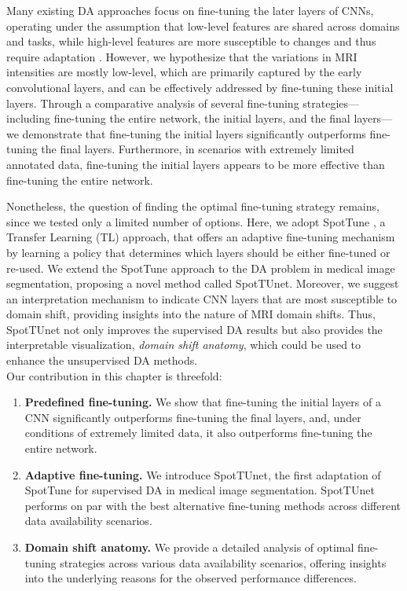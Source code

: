 Many existing DA approaches focus on fine-tuning the later layers of CNNs, operating under the assumption that low-level features are shared across domains and tasks, while high-level features are more susceptible to changes and thus require adaptation \cite{yosinski2014transferable}. However, we hypothesize that the variations in MRI intensities are mostly low-level, which are primarily captured by the early convolutional layers, and can be effectively addressed by fine-tuning these initial layers. Through a comparative analysis of several fine-tuning strategies---including fine-tuning the entire network, the initial layers, and the final layers---we demonstrate that fine-tuning the initial layers significantly outperforms fine-tuning the final layers. Furthermore, in scenarios with extremely limited annotated data, fine-tuning the initial layers appears to be more effective than fine-tuning the entire network.

Nonetheless, the question of finding the optimal fine-tuning strategy remains, since we tested only a limited number of options. Here, we adopt SpotTune \cite{guo2019spottune}, a Transfer Learning (TL) approach, that offers an adaptive fine-tuning mechanism by learning a policy that determines which layers should be either fine-tuned or re-used. We extend the SpotTune approach to the DA problem in medical image segmentation, proposing a novel method called SpotTUnet. Moreover, we suggest an interpretation mechanism to indicate CNN layers that are most susceptible to domain shift, providing insights into the nature of MRI domain shifts. Thus, SpotTUnet not only improves the supervised DA results but also provides the interpretable visualization, \textit{domain shift anatomy}, which could be used to enhance the unsupervised DA methods.\\

Our contribution in this chapter is threefold:
\begin{enumerate}
	\item \textbf{Predefined fine-tuning.} We show that fine-tuning the initial layers of a CNN significantly outperforms fine-tuning the final layers, and, under conditions of extremely limited data, it also outperforms fine-tuning the entire network.
	\item \textbf{Adaptive fine-tuning.} We introduce SpotTUnet, the first adaptation of SpotTune \cite{guo2019spottune} for supervised DA in medical image segmentation. SpotTUnet performs on par with the best alternative fine-tuning methods across different data availability scenarios.
	\item \textbf{Domain shift anatomy.} We provide a detailed analysis of optimal fine-tuning strategies across various data availability scenarios, offering insights into the underlying reasons for the observed performance differences.
\end{enumerate}


